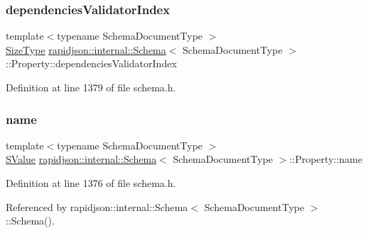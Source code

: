 \subsubsection{\texorpdfstring{dependenciesValidatorIndex}{dependenciesValidatorIndex}}
{\footnotesize\ttfamily template$<$typename Schema\+Document\+Type $>$ \\
\mbox{\hyperlink{namespacerapidjson_a44eb33eaa523e36d466b1ced64b85c84}{Size\+Type}} \mbox{\hyperlink{classrapidjson_1_1internal_1_1_schema}{rapidjson\+::internal\+::\+Schema}}$<$ Schema\+Document\+Type $>$\+::Property\+::dependencies\+Validator\+Index}



Definition at line 1379 of file schema.\+h.

\mbox{\label{structrapidjson_1_1internal_1_1_schema_1_1_property_a3594b85ccedfaf6d8b52783146580abb}} 
\subsubsection{\texorpdfstring{name}{name}}
{\footnotesize\ttfamily template$<$typename Schema\+Document\+Type $>$ \\
\mbox{\hyperlink{classrapidjson_1_1internal_1_1_schema_a9f716b06fc542c4cdb7d8d5cf463bf79}{S\+Value}} \mbox{\hyperlink{classrapidjson_1_1internal_1_1_schema}{rapidjson\+::internal\+::\+Schema}}$<$ Schema\+Document\+Type $>$\+::Property\+::name}



Definition at line 1376 of file schema.\+h.



Referenced by rapidjson\+::internal\+::\+Schema$<$ Schema\+Document\+Type $>$\+::\+Schema().

\mbox{\label{structrapidjson_1_1internal_1_1_schema_1_1_property_a09be9f2fd97139da880c5b2773a3c3a0}} 
